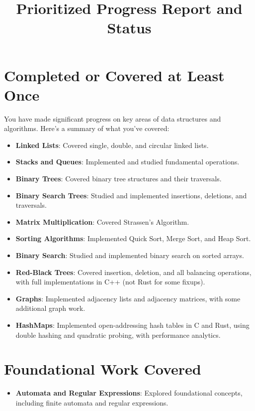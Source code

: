 \documentclass{article}
\begin{document}
\title{Prioritized Progress Report and Status}
\author{}
\date{}
\maketitle

\section{Completed or Covered at Least Once}
You have made significant progress on key areas of data structures and algorithms. Here’s a summary of what you've covered:
\begin{itemize}
    \item \textbf{Linked Lists}: Covered single, double, and circular linked lists.
    \item \textbf{Stacks and Queues}: Implemented and studied fundamental operations.
    \item \textbf{Binary Trees}: Covered binary tree structures and their traversals.
    \item \textbf{Binary Search Trees}: Studied and implemented insertions, deletions, and traversals.
    \item \textbf{Matrix Multiplication}: Covered Strassen’s Algorithm.
    \item \textbf{Sorting Algorithms}: Implemented Quick Sort, Merge Sort, and Heap Sort.
    \item \textbf{Binary Search}: Studied and implemented binary search on sorted arrays.
    \item \textbf{Red-Black Trees}: Covered insertion, deletion, and all balancing operations, with full implementations in C++ (not Rust for some fixups).
    \item \textbf{Graphs}: Implemented adjacency lists and adjacency matrices, with some additional graph work.
    \item \textbf{HashMaps}: Implemented open-addressing hash tables in C and Rust, using double hashing and quadratic probing, with performance analytics.
\end{itemize}

\section{Foundational Work Covered}
\begin{itemize}
    \item \textbf{Automata and Regular Expressions}: Explored foundational concepts, including finite automata and regular expressions.
\end{itemize}
\end{document}

